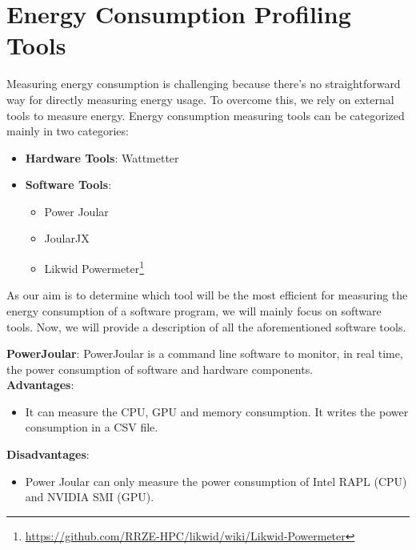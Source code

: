 \section{Energy Consumption Profiling Tools}

Measuring energy consumption is challenging because there's no straightforward way for directly measuring energy usage. To overcome this, we rely on external tools to measure energy. 
Energy consumption measuring tools can be categorized mainly in two categories:
\begin{itemize}
    \item \textbf{Hardware Tools}: Wattmetter ~\cite{bekaroo2014power}
    \item \textbf{Software Tools}:
    \begin{itemize}
    \item {Power Joular ~\cite{DBLP:conf/intenv/Noureddine22}}
    \item {JoularJX ~\cite{DBLP:conf/intenv/Noureddine22}}
    \item {Likwid Powermeter\footnote{\url{https://github.com/RRZE-HPC/likwid/wiki/Likwid-Powermeter}}~\cite{DBLP:journals/corr/abs-1004-4431}}
    \end{itemize}
\end{itemize}

As our aim is to determine which tool will be the most efficient for measuring the energy consumption of a software program, we will mainly focus on software tools. Now, we will provide a description of all the aforementioned software tools.\par \vspace{1em}

\textbf{PowerJoular}: PowerJoular is a command line software to monitor, in real time, the power consumption of software and hardware components.\\

\textbf{Advantages}:
\begin{itemize}
    \renewcommand\labelitemi{}
    \item It can measure the CPU, GPU and memory consumption. It writes the power consumption in a CSV file.
\end{itemize}

\textbf{Disadvantages}:
\begin{itemize}
    \renewcommand\labelitemi{}
    \item Power Joular can only measure the power consumption of Intel RAPL (CPU) and NVIDIA SMI (GPU).
\end{itemize}

